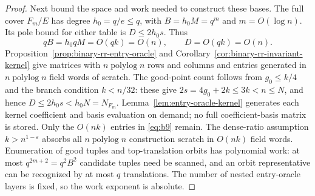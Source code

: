 \documentclass[11pt,letterpaper]{article}
\numberwithin{equation}{section}
\begin{document}
\begin{proof}
Next bound the space and work needed to construct these bases.
The full cover $F_m/E$ has degree $h_0=q/e\le q$, with $B=h_0M=q^m$ and $m=O(\log n)$.
Its pole bound for either table is $D\le2h_0s$.
Thus
\begin{equation}
qB=h_0qM=O(qk)=O(n),\qquad D=O(qk)=O(n).              \label{eq:b10}
\end{equation}
Proposition~\ref{prop:binary-rr-entry-oracle} and Corollary~\ref{cor:binary-rr-invariant-kernel} give matrices with $n\operatorname{polylog}n$ rows and columns and entries generated in $n\operatorname{polylog}n$ field words of scratch.
The good-point count follows from $g_0\le k/4$ and the branch condition $k<n/32$: these give $2s=4g_0+2k\le3k<n\le N$, and hence $D\le2h_0s<h_0N=N_{F_m}$.
Lemma~\ref{lem:entry-oracle-kernel} generates each kernel coefficient and basis evaluation on demand; no full coefficient-basis matrix is stored.
Only the $O(nk)$ entries in \eqref{eq:b9} remain.
The dense-ratio assumption $k>n^{1-\varepsilon}$ absorbs all $n\operatorname{polylog}n$ construction scratch in $O(nk)$ field words.
Enumeration of good tuples and top-translation orbits has polynomial work: at most $q^{2m+2}=q^2B^2$ candidate tuples need be scanned, and an orbit representative can be recognized by at most $q$ translations.
The number of nested entry-oracle layers is fixed, so the work exponent is absolute.


\end{proof}
\end{document}
